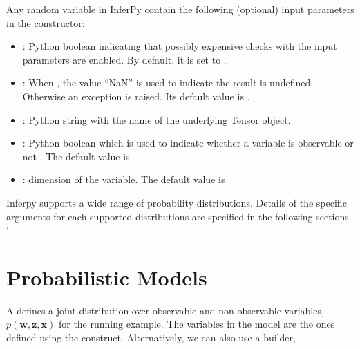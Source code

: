 \documentclass[letterpaper,10pt,english]{sphinxmanual}
\begin{document}
Any random variable in InferPy contain the following (optional) input parameters
in the constructor:
\begin{itemize}
\item {} 
 : Python boolean indicating that possibly expensive checks with the input parameters are enabled.
By default, it is set to .

\item {} 
 : When , the value “NaN” is used to indicate the result is undefined. Otherwise an exception is raised.
Its default value is .

\item {} 
: Python string with the name of the underlying Tensor object.

\item {} 
: Python boolean which is used to indicate whether a variable is observable or not . The default value is 

\item {} 
: dimension of the variable. The default value is 

\end{itemize}

Inferpy supports a wide range of probability distributions. Details of the specific arguments
for each supported distributions are specified in the following sections.
{}`


\section{Probabilistic Models}
\label{\detokenize{notes/guidemodels:probabilistic-models}}
A  defines a joint distribution over observable
and non-observable variables, \(p(\mathbf{w}, \mathbf{z}, \mathbf{x})\) for the
running example. The variables in the model are the ones defined using the
 construct. Alternatively, we can also use a builder,

\begin{sphinxVerbatim}[commandchars=\\\{\}]
  \PYG{p}{[}\PYG{p}{]}
\end{sphinxVerbatim}
\end{document}

